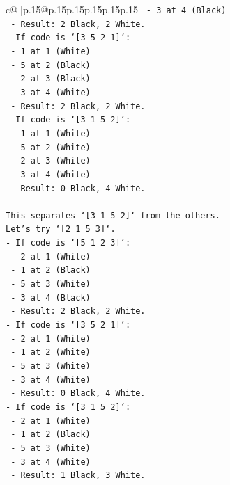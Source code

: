 \documentclass{article}
\begin{document}
{\begin{supertabular}{c@{$\;$}|p{.15\linewidth}@{}p{.15\linewidth}p{.15\linewidth}p{.15\linewidth}p{.15\linewidth}p{.15\linewidth}}
{{{\texttt{  {-} 3 at 4 (Black)} \\
\texttt{  {-} Result: 2 Black, 2 White.} \\
\texttt{{-} If code is `{[}3 5 2 1{]}`:} \\
\texttt{  {-} 1 at 1 (White)} \\
\texttt{  {-} 5 at 2 (Black)} \\
\texttt{  {-} 2 at 3 (Black)} \\
\texttt{  {-} 3 at 4 (White)} \\
\texttt{  {-} Result: 2 Black, 2 White.} \\
\texttt{{-} If code is `{[}3 1 5 2{]}`:} \\
\texttt{  {-} 1 at 1 (White)} \\
\texttt{  {-} 5 at 2 (White)} \\
\texttt{  {-} 2 at 3 (White)} \\
\texttt{  {-} 3 at 4 (White)} \\
\texttt{  {-} Result: 0 Black, 4 White.} \\
\\ 
\texttt{This separates `{[}3 1 5 2{]}` from the others.} \\
\texttt{Let's try `{[}2 1 5 3{]}`.} \\
\texttt{{-} If code is `{[}5 1 2 3{]}`:} \\
\texttt{  {-} 2 at 1 (White)} \\
\texttt{  {-} 1 at 2 (Black)} \\
\texttt{  {-} 5 at 3 (White)} \\
\texttt{  {-} 3 at 4 (Black)} \\
\texttt{  {-} Result: 2 Black, 2 White.} \\
\texttt{{-} If code is `{[}3 5 2 1{]}`:} \\
\texttt{  {-} 2 at 1 (White)} \\
\texttt{  {-} 1 at 2 (White)} \\
\texttt{  {-} 5 at 3 (White)} \\
\texttt{  {-} 3 at 4 (White)} \\
\texttt{  {-} Result: 0 Black, 4 White.} \\
\texttt{{-} If code is `{[}3 1 5 2{]}`:} \\
\texttt{  {-} 2 at 1 (White)} \\
\texttt{  {-} 1 at 2 (Black)} \\
\texttt{  {-} 5 at 3 (White)} \\
\texttt{  {-} 3 at 4 (White)} \\
\texttt{  {-} Result: 1 Black, 3 White.} \\
}}}
\end{supertabular}}
\end{document}
